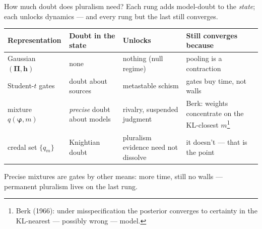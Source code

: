 \documentclass[aspectratio=169,11pt]{beamer}
\newcommand{\Pii}{\bm{\Pi}}
\newcommand{\hh}{\bm{h}}
\begin{document}
\begin{frame}{How much doubt does pluralism need?}
  Each rung adds model-doubt to the \emph{state}; each unlocks dynamics ---
  and every rung but the last still converges.
  \vspace{0.4em}
  \begin{center}
  \footnotesize
  \renewcommand{\arraystretch}{1.25}
  \begin{tabular}{p{2.9cm}p{3.0cm}p{3.1cm}p{3.4cm}}
    \textbf{Representation} & \textbf{Doubt in the state} &
    \textbf{Unlocks} & \textbf{Still converges because}\\
    \hline
    Gaussian $(\Pii,\hh)$ & none & nothing (null regime) & pooling is a contraction \\
    Student-$t$ gates & doubt about sources & metastable schism & gates buy time, not walls \\
    mixture $q(\bm{\varphi},m)$ & \emph{precise} doubt about models & rivalry, suspended judgment & Berk: weights concentrate on the KL-closest $m$\footnote[frame]{\tiny Berk (1966): under misspecification the posterior converges to certainty in the KL-nearest --- possibly wrong --- model.} \\
    credal set $\{q_m\}$ & \alert{Knightian} doubt & pluralism evidence need not dissolve & \alert{it doesn't --- that is the point} \\
  \end{tabular}
  \end{center}
  \vspace{0.2em}
  {\small Precise mixtures are gates by other means: more time, still no walls
   --- permanent pluralism lives on the last rung.}
\end{frame}
\end{document}
